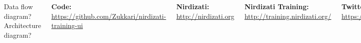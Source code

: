 \documentclass[24pt, a0paper, landscape]{tikzposter}
\begin{document}
\begin{columns}
        {
        Data flow diagram?
        Architecture diagram?
        }

        {
        \textbf{Code:} \href{https://github.com/Zukkari/nirdizati-training-ui}{\url{https://github.com/Zukkari/nirdizati-training-ui}}
        \bigbreak

        \textbf{Nirdizati:} \href{http://nirdizati.org/}{\url{http://nirdizati.org}}
        \bigbreak

        \textbf{Nirdizati Training:} \href{http://training.nirdizati.org/}{\url{http://training.nirdizati.org/}}
        \bigbreak

        \textbf{Twitter:} \href{https://twitter.com/nirdizati}{\url{https://twitter.com/nirdizati}}
        }
    \end{columns}
\end{document}
